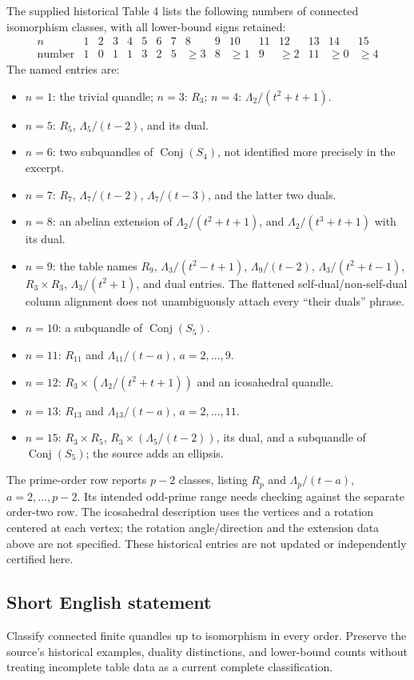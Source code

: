 \documentclass[11pt]{article}
\begin{document}
The supplied historical Table 4 lists the following numbers of connected isomorphism classes, with all lower-bound signs retained:
\[
\begin{array}{c|rrrrrrrrrrrrrrr}
 n&1&2&3&4&5&6&7&8&9&10&11&12&13&14&15\\\hline
 \text{number}&1&0&1&1&3&2&5&\geq3&8&\geq1&9&\geq2&11&\geq0&\geq4
\end{array}
\]
The named entries are:
\begin{itemize}
\item \(n=1\): the trivial quandle; \(n=3\): \(R_3\); \(n=4\): \(\Lambda_2/(t^2+t+1)\).
\item \(n=5\): \(R_5\), \(\Lambda_5/(t-2)\), and its dual.
\item \(n=6\): two subquandles of \(\operatorname{Conj}(S_4)\), not identified more precisely in the excerpt.
\item \(n=7\): \(R_7\), \(\Lambda_7/(t-2)\), \(\Lambda_7/(t-3)\), and the latter two duals.
\item \(n=8\): an abelian extension of \(\Lambda_2/(t^2+t+1)\), and \(\Lambda_2/(t^3+t+1)\) with its dual.
\item \(n=9\): the table names \(R_9\), \(\Lambda_3/(t^2-t+1)\), \(\Lambda_9/(t-2)\), \(\Lambda_3/(t^2+t-1)\), \(R_3\times R_3\), \(\Lambda_3/(t^2+1)\), and dual entries. The flattened self-dual/non-self-dual column alignment does not unambiguously attach every ``their duals'' phrase.
\item \(n=10\): a subquandle of \(\operatorname{Conj}(S_5)\).
\item \(n=11\): \(R_{11}\) and \(\Lambda_{11}/(t-a)\), \(a=2,\ldots,9\).
\item \(n=12\): \(R_3\times(\Lambda_2/(t^2+t+1))\) and an icosahedral quandle.
\item \(n=13\): \(R_{13}\) and \(\Lambda_{13}/(t-a)\), \(a=2,\ldots,11\).
\item \(n=15\): \(R_3\times R_5\), \(R_3\times(\Lambda_5/(t-2))\), its dual, and a subquandle of \(\operatorname{Conj}(S_5)\); the source adds an ellipsis.
\end{itemize}
The prime-order row reports \(p-2\) classes, listing \(R_p\) and \(\Lambda_p/(t-a)\), \(a=2,\ldots,p-2\). Its intended odd-prime range needs checking against the separate order-two row. The icosahedral description uses the vertices and a rotation centered at each vertex; the rotation angle/direction and the extension data above are not specified. These historical entries are not updated or independently certified here.
\subsection{Short English statement}
Classify connected finite quandles up to isomorphism in every order. Preserve the source's historical examples, duality distinctions, and lower-bound counts without treating incomplete table data as a current complete classification.
\end{document}
